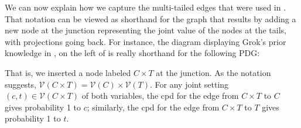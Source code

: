 \documentclass{article}
\theoremstyle{plain}
\theoremstyle{definition}
\theoremstyle{remark}
\newcommand{\V}{\mathcal V}
\newcommand{\MN}{PDG}
\numberwithin{equation}{section}
\begin{document}
        We can now explain how we capture   the multi-tailed edges that 
        were used in 
. 
That notation can be viewed as shorthand for the graph that results by adding a new node at the junction representing the joint value of the nodes at the tails, with projections going back.  For instance,
the diagram displaying Grok's prior knowledge in , on the left of 
is really shorthand for the following \MN:
	\begin{center}
% 
% 
% 
	\end{center}
That is, we inserted a node labeled $C \times T$ at the junction.  As
the notation suggests, $\V( C \times T) = \V(C) \times \V(T)$.
For any joint setting $(c,t) \in \V(C \times T)$ of both variables, the cpd for
the edge from $C \times T$ to $C$ gives probability 1 to $c$;
similarly, the cpd for the edge from $ C \times T$ to $T$ gives probability 1 to $t$.
\end{document}
